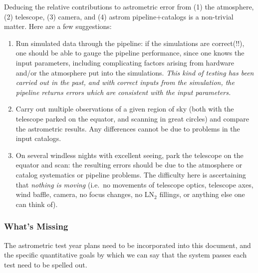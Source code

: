 Deducing the relative contributions to astrometric error from (1) the
atmosphere, (2) telescope, (3) camera, and (4) astrom pipeline+catalogs is
a non-trivial matter.  Here are a few suggestions:
\begin{enumerate}
\item Run simulated data through the pipeline:  if the simulations are
correct(!!), one should be able to gauge the pipeline performance, since
one knows the input parameters, including complicating factors arising
from hardware and/or the atmosphere put into the simulations.  {\it This
kind of testing has been carried out in the past, and with correct
inputs from the simulation, the pipeline returns errors which
are consistent with the input parameters.}
\item Carry out multiple observations of a given region of sky (both
with the telescope parked on the equator, and scanning in great
circles) and compare the astrometric results.  Any differences cannot
be due to problems in the input catalogs. 
\item On several windless nights with excellent seeing, park the
telescope on the equator and scan: the resulting errors 
should be due to the atmosphere or catalog systematics or pipeline problems.
The difficulty here is ascertaining that {\em nothing is moving} (i.e.\ no
movements of telescope optics, telescope axes, wind baffle, camera, no
focus changes, no LN$_2$ fillings, or anything else one can think of).
\end{enumerate}

\subsubsection{What's Missing}
The astrometric test year plans need to be incorporated into this
document, and the specific quantitative goals by which we can say that
the system passes each test need to be spelled out.

